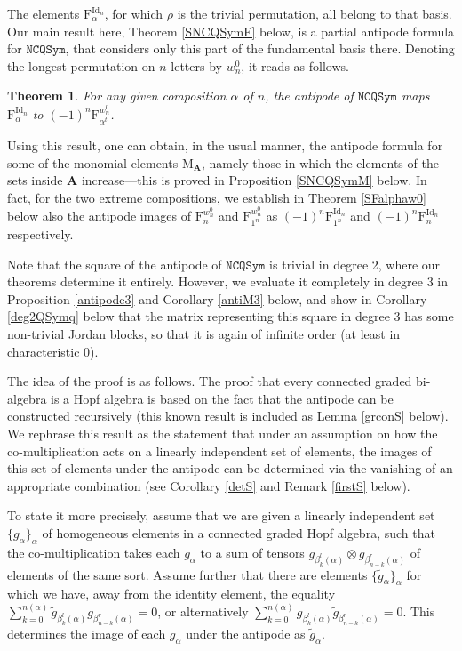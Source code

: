 \documentclass{article}
\newtheorem*{thmnn}{Theorem}
\theoremstyle{definition}
\begin{document}
The elements $\mathrm{F}_{\alpha}^{\operatorname{Id}_{n}}$, for which $\rho$ is the trivial permutation, all belong to that basis. Our main result here, Theorem \ref{SNCQSymF} below, is a partial antipode formula for $\mathtt{NCQSym}$, that considers only this part of the fundamental basis there. Denoting the longest permutation on $n$ letters by $w^{0}_{n}$, it reads as follows.
\begin{thmnn}
For any given composition $\alpha$ of $n$, the antipode of $\mathtt{NCQSym}$ maps $\mathrm{F}_{\alpha}^{\operatorname{Id}_{n}}$ to $(-1)^{n}\mathrm{F}_{\alpha^{t}}^{w^{0}_{n}}$.
\end{thmnn}
Using this result, one can obtain, in the usual manner, the antipode formula for some of the monomial elements $\mathrm{M}_{\mathbf{A}}$, namely those in which the elements of the sets inside $\mathbf{A}$ increase---this is proved in Proposition \ref{SNCQSymM} below. In fact, for the two extreme compositions, we establish in Theorem \ref{SFalphaw0} below also the antipode images of $\mathrm{F}_{n}^{w^{0}_{n}}$ and $\mathrm{F}_{1^{n}}^{w^{0}_{n}}$ as $(-1)^{n}\mathrm{F}_{1^{n}}^{\operatorname{Id}_{n}}$ and $(-1)^{n}\mathrm{F}_{n}^{\operatorname{Id}_{n}}$ respectively.

Note that the square of the antipode of $\mathtt{NCQSym}$ is trivial in degree 2, where our theorems determine it entirely. However, we evaluate it completely in degree 3 in Proposition \ref{antipode3} and Corollary \ref{antiM3} below, and show in Corollary \ref{deg2QSymq} below that the matrix representing this square in degree 3 has some non-trivial Jordan blocks, so that it is again of infinite order (at least in characteristic 0).

\medskip

The idea of the proof is as follows. The proof that every connected graded bi-algebra is a Hopf algebra is based on the fact that the antipode can be constructed recursively (this known result is included as Lemma \ref{grconS} below). We rephrase this result as the statement that under an assumption on how the co-multiplication acts on a linearly independent set of elements, the images of this set of elements under the antipode can be determined via the vanishing of an appropriate combination (see Corollary \ref{detS} and Remark \ref{firstS} below).

To state it more precisely, assume that we are given a linearly independent set $\{g_{\alpha}\}_{\alpha}$ of homogeneous elements in a connected graded Hopf algebra, such that the co-multiplication takes each $g_{\alpha}$ to a sum of tensors $g_{\beta_{k}^{l}(\alpha)} \otimes g_{\beta_{n-k}^{r}(\alpha)}$ of elements of the same sort. Assume further that there are elements $\{\tilde{g}_{\alpha}\}_{\alpha}$ for which we have, away from the identity element, the equality $\sum_{k=0}^{n(\alpha)}\tilde{g}_{\beta_{k}^{l}(\alpha)}g_{\beta_{n-k}^{r}(\alpha)}=0$, or alternatively $\sum_{k=0}^{n(\alpha)}g_{\beta_{k}^{l}(\alpha)}\tilde{g}_{\beta_{n-k}^{r}(\alpha)}=0$. This determines the image of each $g_{\alpha}$ under the antipode as $\tilde{g}_{\alpha}$.
\end{document}
